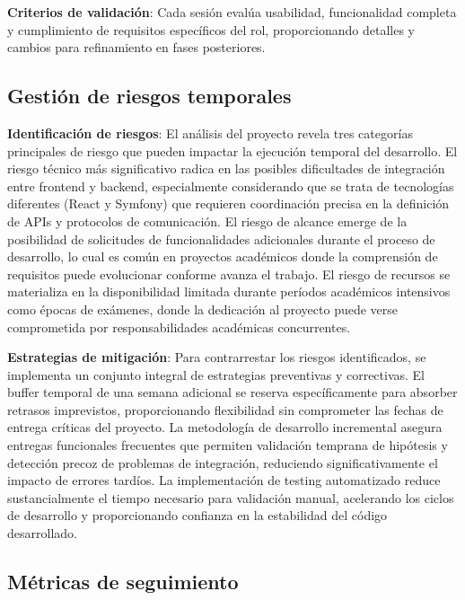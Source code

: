 \documentclass[12pt,a4paper,oneside]{report}
\begin{document}
\textbf{Criterios de validación}: Cada sesión evalúa usabilidad,
funcionalidad completa y cumplimiento de requisitos específicos del rol,
proporcionando detalles y cambios para refinamiento en fases posteriores.

\subsection{Gestión de riesgos
temporales}\label{gestiuxf3n-de-riesgos-temporales}

\textbf{Identificación de riesgos}: El análisis del proyecto revela tres categorías principales de riesgo que pueden impactar la ejecución temporal del desarrollo. El riesgo técnico más significativo radica en las posibles dificultades de integración entre frontend y backend, especialmente considerando que se trata de tecnologías diferentes (React y Symfony) que requieren coordinación precisa en la definición de APIs y protocolos de comunicación. El riesgo de alcance emerge de la posibilidad de solicitudes de funcionalidades adicionales durante el proceso de desarrollo, lo cual es común en proyectos académicos donde la comprensión de requisitos puede evolucionar conforme avanza el trabajo. El riesgo de recursos se materializa en la disponibilidad limitada durante períodos académicos intensivos como épocas de exámenes, donde la dedicación al proyecto puede verse comprometida por responsabilidades académicas concurrentes.

\textbf{Estrategias de mitigación}: Para contrarrestar los riesgos identificados, se implementa un conjunto integral de estrategias preventivas y correctivas. El buffer temporal de una semana adicional se reserva específicamente para absorber retrasos imprevistos, proporcionando flexibilidad sin comprometer las fechas de entrega críticas del proyecto. La metodología de desarrollo incremental asegura entregas funcionales frecuentes que permiten validación temprana de hipótesis y detección precoz de problemas de integración, reduciendo significativamente el impacto de errores tardíos. La implementación de testing automatizado reduce sustancialmente el tiempo necesario para validación manual, acelerando los ciclos de desarrollo y proporcionando confianza en la estabilidad del código desarrollado.

\subsection{Métricas de seguimiento}\label{muxe9tricas-de-seguimiento}
\end{document}
